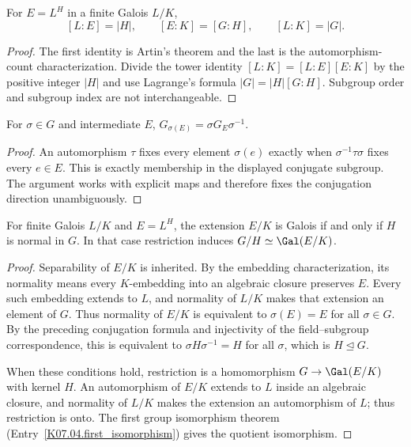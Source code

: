\begin{corollary}
For $E=L^H$ in a finite Galois $L/K$,
\[[L:E]=|H|,\qquad [E:K]=[G:H],\qquad[L:K]=|G|.\]
\end{corollary}
\begin{proof}
The first identity is Artin's theorem and the last is the automorphism-count characterization. Divide the tower identity $[L:K]=[L:E][E:K]$ by the positive integer $|H|$ and use Lagrange's formula $|G|=|H|[G:H]$. Subgroup order and subgroup index are not interchangeable.
\end{proof}

\begin{proposition}
For $\sigma\in G$ and intermediate $E$, $G_{\sigma(E)}=\sigma G_E\sigma^{-1}$.
\end{proposition}
\begin{proof}
An automorphism $\tau$ fixes every element $\sigma(e)$ exactly when $\sigma^{-1}\tau\sigma$ fixes every $e\in E$. This is exactly membership in the displayed conjugate subgroup. The argument works with explicit maps and therefore fixes the conjugation direction unambiguously.
\end{proof}

\begin{theorem}
For finite Galois $L/K$ and $E=L^H$, the extension $E/K$ is Galois if and only if $H$ is normal in $G$. In that case restriction induces $G/H\simeq\Gal(E/K)$.
\end{theorem}
\begin{proof}
Separability of $E/K$ is inherited. By the embedding characterization, its normality means every $K$-embedding into an algebraic closure preserves $E$. Every such embedding extends to $L$, and normality of $L/K$ makes that extension an element of $G$. Thus normality of $E/K$ is equivalent to $\sigma(E)=E$ for all $\sigma\in G$. By the preceding conjugation formula and injectivity of the field--subgroup correspondence, this is equivalent to $\sigma H\sigma^{-1}=H$ for all $\sigma$, which is $H\trianglelefteq G$.

When these conditions hold, restriction is a homomorphism $G\to\Gal(E/K)$ with kernel $H$. An automorphism of $E/K$ extends to $L$ inside an algebraic closure, and normality of $L/K$ makes the extension an automorphism of $L$; thus restriction is onto. The first group isomorphism theorem (Entry~\ref{K07.04.first_isomorphism}) gives the quotient isomorphism.
\end{proof}

